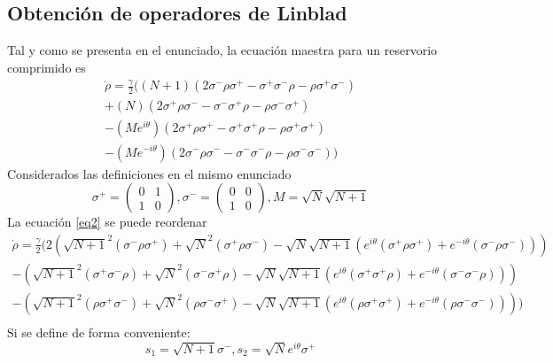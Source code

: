 \documentclass{book}
\begin{document}
\subsection{{Obtención de operadores de Linblad}}
Tal y como se presenta en el enunciado, la ecuación maestra para un reservorio comprimido es
\begin{equation}\label{eq2}\begin{aligned} {\dot{\rho}=\frac{\gamma}{2}((N+1)(2\sigma^-\rho\sigma^+-\sigma^+\sigma^-\rho-\rho\sigma^+\sigma^-)}\\ {+(N)(2\sigma^+\rho\sigma^--\sigma^-\sigma^+\rho-\rho\sigma^-\sigma^+)} \\ {-(Me^{i\theta})(2\sigma^+\rho\sigma^+-\sigma^+\sigma^+\rho-\rho\sigma^+\sigma^+)}\\
{-(Me^{-i\theta})(2\sigma^-\rho\sigma^--\sigma^-\sigma^-\rho-\rho\sigma^-\sigma^-))}\end{aligned}\end{equation}
Considerados las definiciones en el mismo enunciado
\begin{equation}\label{eq2.a} {\sigma^+=\begin{pmatrix} 0&1\\ 1&0\end{pmatrix}, \sigma^-=\begin{pmatrix}0&0\\1&0\end{pmatrix},  M=\sqrt{N}\sqrt{N+1}}\end{equation}
La ecuación \ref{eq2} se puede reordenar
\begin{equation}\label{eq2.b}\begin{aligned} {\dot{\rho}=\frac{\gamma}{2}(2(\sqrt{N+1}^2(\sigma^-\rho\sigma^+)+\sqrt{N}^2(\sigma^+\rho\sigma^-)-\sqrt{N}\sqrt{N+1}(e^{i\theta}(\sigma^+\rho\sigma^+)+e^{-i\theta}(\sigma^-\rho\sigma^-)))}\\ {-(\sqrt{N+1}^2(\sigma^+\sigma^-\rho)+\sqrt{N}^2(\sigma^-\sigma^+\rho)-\sqrt{N}\sqrt{N+1}(e^{i\theta}(\sigma^+\sigma^+\rho)+e^{-i\theta}(\sigma^-\sigma^-\rho)))} \\ {-(\sqrt{N+1}^2(\rho\sigma^+\sigma^-)+\sqrt{N}^2(\rho\sigma^-\sigma^+)-\sqrt{N}\sqrt{N+1}(e^{i\theta}(\rho\sigma^+\sigma^+)+e^{-i\theta}(\rho\sigma^-\sigma^-))))}\\ \end{aligned}\end{equation}
Si se define de forma conveniente:
\begin{equation}{s_1=\sqrt{N+1}\sigma^-, s_2=\sqrt{N}e^{i\theta}\sigma^+}\end{equation}
\end{document}
